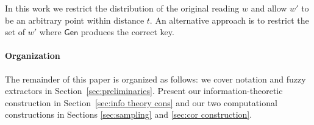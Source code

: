 \documentclass[11pt]{article}
\newcommand{\secref}[1]{\mbox{Section~\ref{#1}}}
\newcommand{\class}[1]{{\ensuremath{\mathsf{#1}}}}
\newcommand{\gen}{\ensuremath{\class{Gen}}\xspace}
\newcommand{\Huse}{\mathrm{H}_{\mathtt{usable}}}
\newcommand{\authnote}[2]{{\textcolor{red}{\textsf{#1 notes: }\textcolor{blue}{ #2}}\marginpar{\textcolor{red}{\textbf{!!!!!}}}}}
\newcommand{\authnote}[2]{}
\newcommand{\bnote}[1]{{\authnote{Ben}{#1}}}
\begin{document}


In this work we restrict the distribution of the original reading $w$ and allow $w'$ to be an arbitrary point within distance $t$.  An alternative approach is to restrict the set of $w'$ where $\gen$ produces the correct key.%

\medskip
\paragraph{Organization }
The remainder of this paper is organized as follows: we cover notation and fuzzy extractors in \secref{sec:preliminaries}.  Present our information-theoretic construction in \secref{sec:info theory cons} and our two computational constructions in Sections \ref{sec:sampling} and \ref{sec:cor construction}.
\end{document}
